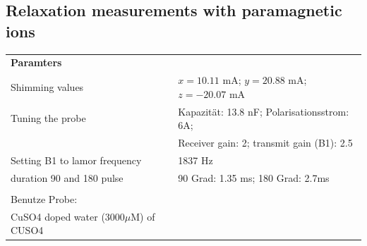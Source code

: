    \subsection{Relaxation measurements with paramagnetic ions}
\begin{tabular}{ll}

    {\bf Paramters} &            \\
    
    Shimming values & $x = 10.11$ mA; $y = 20.88$ mA; $z = −20.07$ mA \\
    
    Tuning the probe & Kapazität: 13.8 nF; Polarisationsstrom: 6A;\\
    & Receiver gain: 2; transmit gain (B1): 2.5\\
    
    Setting B1 to lamor frequency &    1837 Hz \\
    
    duration 90 and 180 pulse & 90 Grad: 1.35 ms; 180 Grad: 2.7ms \\
    
               &            \\
    
    Benutze Probe: & \\
    CuSO4 doped water (3000$\mu$M) of CUSO4 &            \\
    
    \end{tabular}  

